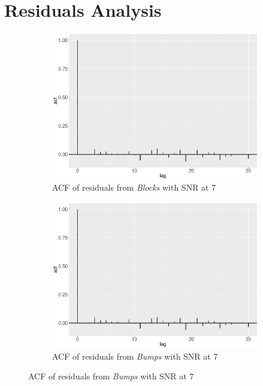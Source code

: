 
\section{Residuals Analysis}
\begin{figure}[!ht]
    \centering
    \begin{subfigure}{0.45\textwidth}
    \centering
    \includegraphics[width=\textwidth]{Chapters/02TractorSplineTheory/plot/ggplot/ggacfBlocks7.pdf}
    \caption{ACF of residuals from \textit{Blocks} with SNR at 7 }
    \end{subfigure}%
    \begin{subfigure}{0.45\textwidth}
    \centering
    \includegraphics[width=\textwidth]{Chapters/02TractorSplineTheory/plot/ggplot/ggacfBumps7.pdf}
    \caption{ACF of residuals from \textit{Bumps} with SNR at 7 }

\end{subfigure}
\end{figure}
